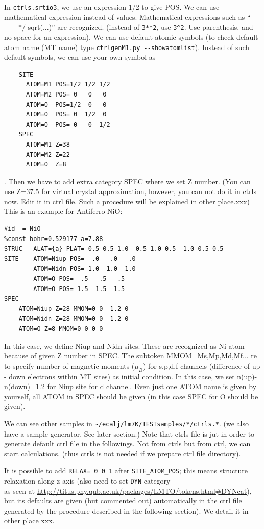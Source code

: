 \documentclass[a4paper,10pt,epsf,fleqn]{article}
\begin{document}
In \verb+ctrls.srtio3+, we use an expression 1/2 to give POS. 
We can use mathematical expression instead of values.
Mathematical expressions such as ``$+ -  * /$ sqrt(...)'' are recognized.
(instead of \verb+3**2+, use \verb+3^2+. Use parenthesis, and
 no space for an expression).
We can use default atomic symbols (to check default atom name
(MT name) type \verb+ctrlgenM1.py --showatomlist+).
Instead of such default symbols, we can use your own symbol as
\begin{verbatim}
    SITE
      ATOM=M1 POS=1/2 1/2 1/2
      ATOM=M2 POS= 0   0   0
      ATOM=O  POS=1/2  0   0
      ATOM=O  POS= 0  1/2  0
      ATOM=O  POS= 0   0  1/2
    SPEC
      ATOM=M1 Z=38
      ATOM=M2 Z=22
      ATOM=O  Z=8
\end{verbatim}
. Then we have to add extra category SPEC where we set Z number.
(You can use Z=37.5 for virtual crystal approximation, however, 
you can not do it in ctrls now. Edit it in ctrl file. Such a procedure
will be explained in other place.xxx)\\

This is an example for Antiferro NiO:
\begin{verbatim}
#id  = NiO
%const bohr=0.529177 a=7.88
STRUC   ALAT={a} PLAT= 0.5 0.5 1.0  0.5 1.0 0.5  1.0 0.5 0.5
SITE    ATOM=Niup POS=  .0   .0   .0
        ATOM=Nidn POS= 1.0  1.0  1.0
        ATOM=O POS=  .5   .5   .5
        ATOM=O POS= 1.5  1.5  1.5
SPEC
    ATOM=Niup Z=28 MMOM=0 0  1.2 0
    ATOM=Nidn Z=28 MMOM=0 0 -1.2 0
    ATOM=O Z=8 MMOM=0 0 0 0
\end{verbatim}
In this case, we define Niup and Nidn sites. These are recognized as
Ni atom because of given Z number in SPEC. The subtoken MMOM=Ms,Mp,Md,Mf...
re to specify number of magnetic moments ($\mu_B$) for s,p,d,f channels (difference of up -
down electrons within MT sites) as initial condition. In this case, we set n(up)-n(down)=1.2
for Niup site for d channel. Even just one ATOM name is given
by yourself, all ATOM in SPEC should be given (in this case SPEC for O should be given).

We can see other samples in \verb+~/ecalj/lm7K/TESTsamples/*/ctrls.*+.
(we also have a sample generator. See later section.)
Note that ctrls file is jut in order to generate default ctrl file in
the followings. Not from ctrls but from ctrl, we can start calculations.
(thus ctrls is not needed if we prepare ctrl file directory).

It is possible to add \verb+RELAX= 0 0 1+ after \verb+SITE_ATOM_POS+;
this means structure relaxation along z-axis 
(also need to set \verb+DYN+ category \\
as seen at \url{http://titus.phy.qub.ac.uk/packages/LMTO/tokens.html#DYNcat}),
but its defaults are given (but commented out) automatically in the ctrl file
generated by the procedure described in the following section).
We detail it in other place xxx.\\
\end{document}
